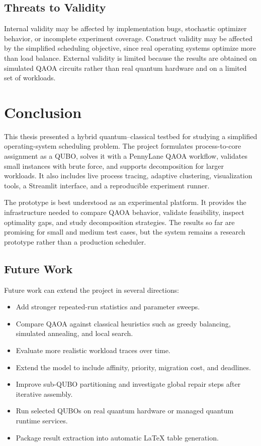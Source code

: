 \documentclass[12pt,a4paper,oneside]{report}
\begin{document}
\section{Threats to Validity}

Internal validity may be affected by implementation bugs, stochastic optimizer
behavior, or incomplete experiment coverage. Construct validity may be affected
by the simplified scheduling objective, since real operating systems optimize
more than load balance. External validity is limited because the results are
obtained on simulated QAOA circuits rather than real quantum hardware and on a
limited set of workloads.

\chapter{Conclusion}
\label{chap:conclusion}

This thesis presented a hybrid quantum--classical testbed for studying a
simplified operating-system scheduling problem. The project formulates
process-to-core assignment as a QUBO, solves it with a PennyLane QAOA workflow,
validates small instances with brute force, and supports decomposition for
larger workloads. It also includes live process tracing, adaptive clustering,
visualization tools, a Streamlit interface, and a reproducible experiment
runner.

The prototype is best understood as an experimental platform. It provides the
infrastructure needed to compare QAOA behavior, validate feasibility, inspect
optimality gaps, and study decomposition strategies. The results so far are
promising for small and medium test cases, but the system remains a research
prototype rather than a production scheduler.

\section{Future Work}

Future work can extend the project in several directions:

\begin{itemize}
  \item Add stronger repeated-run statistics and parameter sweeps.
  \item Compare QAOA against classical heuristics such as greedy balancing,
  simulated annealing, and local search.
  \item Evaluate more realistic workload traces over time.
  \item Extend the model to include affinity, priority, migration cost, and
  deadlines.
  \item Improve sub-QUBO partitioning and investigate global repair steps after
  iterative assembly.
  \item Run selected QUBOs on real quantum hardware or managed quantum runtime
  services.
  \item Package result extraction into automatic LaTeX table generation.
\end{itemize}
\end{document}
